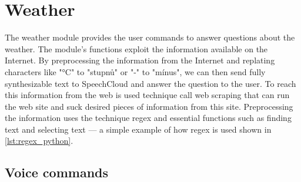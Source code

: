 \section{Weather}

The weather module provides the user commands to answer questions about the weather. The module's functions exploit the information available on the Internet. By preprocessing the information from the Internet and replating characters like "°C" to "stupnů" or "-" to "mínus", we can then send fully synthesizable text to SpeechCloud and answer the question to the user. To reach this information from the web is used technique call web scraping that can run the web site and suck desired pieces of information from this site. Preprocessing the information uses the technique regex and essential functions such as finding text and selecting text — a simple example of how regex is used shown in \cref{lst:regex_python}.

% 

\subsection{Voice commands}

